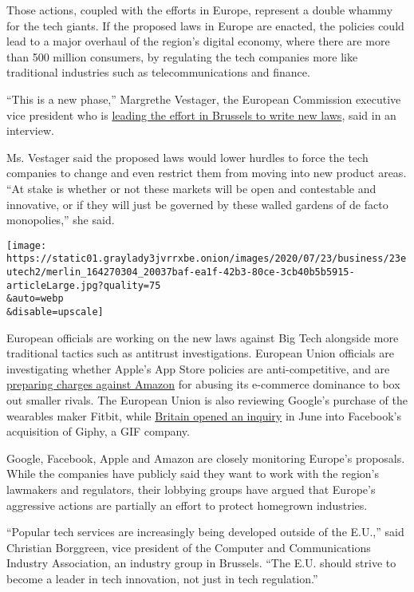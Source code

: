 Those actions, coupled with the efforts in Europe, represent a double
whammy for the tech giants. If the proposed laws in Europe are enacted,
the policies could lead to a major overhaul of the region's digital
economy, where there are more than 500 million consumers, by regulating
the tech companies more like traditional industries such as
telecommunications and finance.

``This is a new phase,'' Margrethe Vestager, the European Commission
executive vice president who is
\href{https://www.nytimes3xbfgragh.onion/2019/11/19/technology/tech-regulator-europe.html}{leading
the effort in Brussels to write new laws}, said in an interview.

Ms. Vestager said the proposed laws would lower hurdles to force the
tech companies to change and even restrict them from moving into new
product areas. ``At stake is whether or not these markets will be open
and contestable and innovative, or if they will just be governed by
these walled gardens of de facto monopolies,'' she said.

\texttt{[image: https://static01.graylady3jvrrxbe.onion/images/2020/07/23/business/23eutech2/merlin\_164270304\_20037baf-ea1f-42b3-80ce-3cb40b5b5915-articleLarge.jpg?quality=75\\\&auto=webp\\\&disable=upscale]}

European officials are working on the new laws against Big Tech
alongside more traditional tactics such as antitrust investigations.
European Union officials are investigating whether Apple's App Store
policies are anti-competitive, and are
\href{https://www.nytimes3xbfgragh.onion/2020/06/11/technology/amazon-antitrust-european-union.html}{preparing
charges against Amazon} for abusing its e-commerce dominance to box out
smaller rivals. The European Union is also reviewing Google's purchase
of the wearables maker Fitbit, while
\href{https://www.gov.uk/cma-cases/facebook-inc-giphy-inc-merger-inquiry}{Britain
opened an inquiry} in June into Facebook's acquisition of Giphy, a GIF
company.

Google, Facebook, Apple and Amazon are closely monitoring Europe's
proposals. While the companies have publicly said they want to work with
the region's lawmakers and regulators, their lobbying groups have argued
that Europe's aggressive actions are partially an effort to protect
homegrown industries.

``Popular tech services are increasingly being developed outside of the
E.U.,'' said Christian Borggreen, vice president of the Computer and
Communications Industry Association, an industry group in Brussels.
``The E.U. should strive to become a leader in tech innovation, not just
in tech regulation.''

